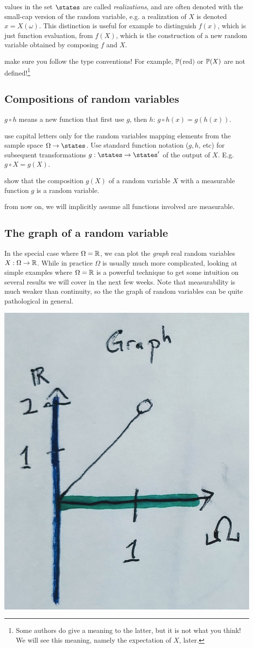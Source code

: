 \documentclass{article}
\begin{document}
 values in the set $\states$ are called \emph{realizations}, and are often denoted with the small-cap version of the random variable, e.g. a realization of $X$ is denoted $x = X(\omega)$. This distinction is useful for example to distinguish $f(x)$, which is just function evaluation, from $f(X)$, which is the construction of a new random variable obtained by composing $f$ and $X$.

 make sure you follow the type conventions! For example, $\P($red$)$ or $\P(X)$ are not defined!\footnote{Some authors do give a meaning to the latter, but it is not what you think! We will see this meaning, namely the expectation of $X$, later.}


\subsection{Compositions of random variables}\label{sec:composition-of-rv}

 $g \circ h$ means a new function that first use $g$, then $h$: $g \circ h(x) = g(h(x))$. 

 use capital letters only for the random variables mapping elements from the sample space $\Omega \to \states$. Use standard function notation ($g, h$, etc) for subsequent transformations $g : \states \to \states'$  of the output of $X$. E.g. $g \circ X = g(X)$. 

 show that the composition $g(X)$ of a random variable $X$ with a measurable function $g$ is a random variable.

 from now on, we will implicitly assume all functions involved are measurable. 


\subsection{The graph of a random variable}

In the special case where $\Omega = \R$, we can plot the \emph{graph} real random variables $X : \Omega \to \R$. While in practice $\Omega$ is usually much more complicated, looking at simple examples where $\Omega = \R$ is a powerful technique to get some intuition on several results we will cover in the next few weeks. Note that measurability is much weaker than continuity, so the the graph of random variables can be quite pathological in general. 
\begin{center}
	\includegraphics[width=0.3\linewidth]{figures/graph}
\end{center}
\end{document}
